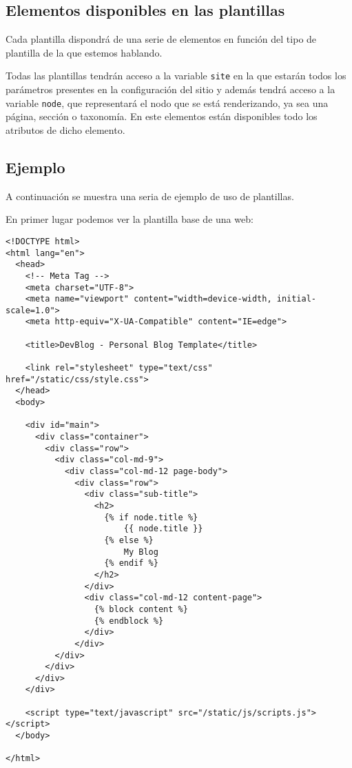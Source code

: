 \subsection{Elementos disponibles en las plantillas}

Cada plantilla dispondrá de una serie de elementos en función del tipo de plantilla de la que estemos
hablando.

Todas las plantillas tendrán acceso a la variable \texttt{site} en la que estarán todos los parámetros
presentes en la configuración del sitio y además tendrá acceso a la variable \texttt{node}, que representará
el nodo que se está renderizando, ya sea una página, sección o taxonomía. En este elementos están disponibles
todo los atributos de dicho elemento.

\subsection{Ejemplo}

A continuación se muestra una seria de ejemplo de uso de plantillas.

En primer lugar podemos ver la plantilla base de una web:

\begin{verbatim}
<!DOCTYPE html>
<html lang="en">
  <head>
    <!-- Meta Tag -->
    <meta charset="UTF-8">
    <meta name="viewport" content="width=device-width, initial-scale=1.0">
    <meta http-equiv="X-UA-Compatible" content="IE=edge">

    <title>DevBlog - Personal Blog Template</title>

    <link rel="stylesheet" type="text/css" href="/static/css/style.css">
  </head>
  <body>

    <div id="main">
      <div class="container">
        <div class="row">
          <div class="col-md-9">
            <div class="col-md-12 page-body">
              <div class="row">
                <div class="sub-title">
                  <h2>
                    {% if node.title %}
                        {{ node.title }}
                    {% else %}
                        My Blog
                    {% endif %}
                  </h2>
                </div>
                <div class="col-md-12 content-page">
                  {% block content %}
                  {% endblock %}
                </div>
              </div>
          </div>
        </div>
      </div>
    </div>

    <script type="text/javascript" src="/static/js/scripts.js"></script>
  </body>

</html>
\end{verbatim}

